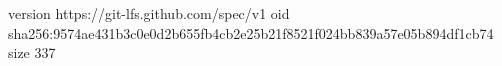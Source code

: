version https://git-lfs.github.com/spec/v1
oid sha256:9574ae431b3c0e0d2b655fb4cb2e25b21f8521f024bb839a57e05b894df1cb74
size 337
